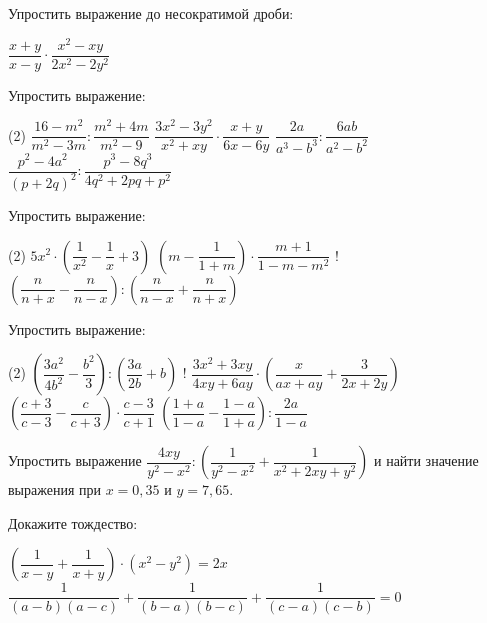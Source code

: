 \begin{homework}[number=3]
	\begin{listofex}
	\item Упростить выражение до несократимой дроби:
	\begin{tasks}
		\task \( \dfrac{x+y}{x-y}\cdot\dfrac{x^2-xy}{2x^2-2y^2} \)
	\end{tasks}
	\item Упростить выражение:
	\begin{tasks}(2)
		\task \( \dfrac{16-m^2}{m^2-3m}:\dfrac{m^2+4m}{m^2-9} \)
		\task \( \dfrac{3x^2-3y^2}{x^2+xy}\cdot\dfrac{x+y}{6x-6y} \)
		\task \( \dfrac{2a}{a^3-b^3}:\dfrac{6ab}{a^2-b^2} \)
		\task \( \dfrac{p^2-4a^2}{(p+2q)^2}:\dfrac{p^3-8q^3}{4q^2+2pq+p^2} \)
	\end{tasks}
	\item Упростить выражение:
	\begin{tasks}(2)
		\task \( 5x^2\cdot\left( \dfrac{1}{x^2}-\dfrac{1}{x}+3 \right) \)
		\task \( \left( m-\dfrac{1}{1+m} \right)\cdot\dfrac{m+1}{1-m-m^2} \)
		\task! \( \left( \dfrac{n}{n+x}-\dfrac{n}{n-x} \right):\left( \dfrac{n}{n-x}+\dfrac{n}{n+x} \right) \)
	\end{tasks}
	\item Упростить выражение:
	\begin{tasks}(2)
		\task \( \left( \dfrac{3a^2}{4b^2}-\dfrac{b^2}{3} \right):\left( \dfrac{3a}{2b}+b \right) \)
		\task! \( \dfrac{3x^2+3xy}{4xy+6ay}\cdot\left( \dfrac{x}{ax+ay}+\dfrac{3}{2x+2y} \right) \)
		\task \( \left( \dfrac{c+3}{c-3}-\dfrac{c}{c+3} \right)\cdot\dfrac{c-3}{c+1} \)
		\task \( \left( \dfrac{1+a}{1-a}-\dfrac{1-a}{1+a} \right):\dfrac{2a}{1-a} \)
	\end{tasks}
	\item Упростить выражение \( \dfrac{4xy}{y^2-x^2}:\left( \dfrac{1}{y^2-x^2}+\dfrac{1}{x^2+2xy+y^2} \right) \) и найти значение выражения при \( x=0,35 \) и \( y=7,65 \).
	\item Докажите тождество:
	\begin{tasks} 
		\task \( \left( \dfrac{1}{x-y}+\dfrac{1}{x+y} \right)\cdot(x^2-y^2)=2x \)
		\task \( \dfrac{1}{(a-b)(a-c)}+\dfrac{1}{(b-a)(b-c)}+\dfrac{1}{(c-a)(c-b)}=0 \)
	\end{tasks}
	\end{listofex}
\end{homework}

